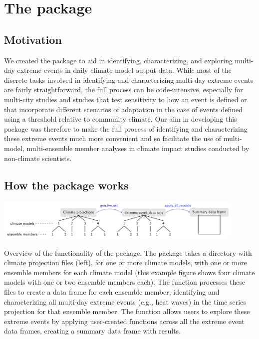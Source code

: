 \section{\texorpdfstring{The 
package}{The  package}}\label{the-package}

\subsection{Motivation}\label{motivation}

We created the  package to aid in identifying,
characterizing, and exploring multi-day extreme events in daily climate
model output data. While most of the discrete tasks involved in
identifying and characterizing multi-day extreme events are fairly
straightforward, the full process can be code-intensive, especially for
multi-city studies and studies that test sensitivity to how an event is
defined or that incorporate different scenarios of adaptation in the
case of events defined using a threshold relative to community climate.
Our aim in developing this package was therefore to make the full
process of identifying and characterizing these extreme events much more
convenient and so facilitate the use of multi-model, multi-ensemble
member analyses in climate impact studies conducted by non-climate
scientists.

\subsection{How the package works}\label{how-the-package-works}

\begin{widefigure}
\includegraphics[width = 0.9\textwidth]{OverviewFigure}
\caption{Overview of the functionality of the  package. The package takes a directory with climate projection files (left), for one or more climate models, with one or more ensemble members for each climate model (this example figure shows four climate models with one or two ensemble members each). The  function processes these files to create a data frame for each ensemble member, identifying and characterizing all multi-day extreme events (e.g., heat waves) in the time series projection for that ensemble member. The  function allows users to explore these extreme events by applying user-created functions across all the extreme event data frames, creating a summary data frame with results.}
\label{fig:overview}
\end{widefigure}

